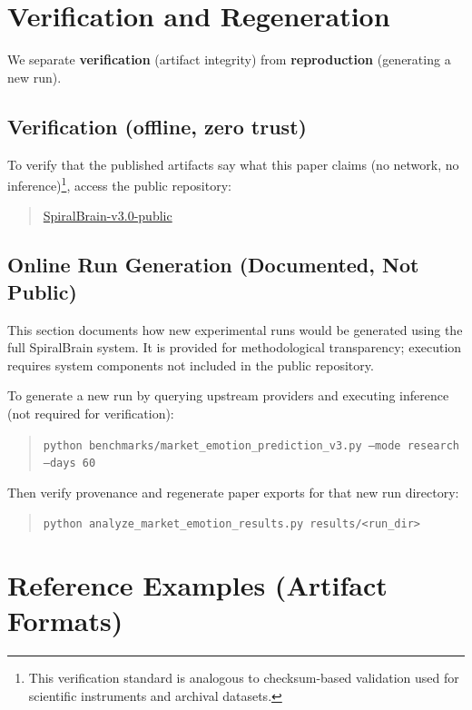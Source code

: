 \documentclass[12pt,a4paper]{report}
\begin{document}
\section{Verification and Regeneration}

We separate \textbf{verification} (artifact integrity) from \textbf{reproduction} (generating a new run).

\subsection{Verification (offline, zero trust)}

To verify that the published artifacts say what this paper claims (no network, no inference)\footnote{This verification standard is analogous to checksum-based validation used for scientific instruments and archival datasets.}, access the public repository:

\begin{quote}
\href{https://github.com/jhcragin/SpiralBrain-v3.0-public}{SpiralBrain-v3.0-public}
\end{quote}

\subsection{Online Run Generation (Documented, Not Public)}

This section documents how new experimental runs would be generated using the full SpiralBrain system. It is provided for methodological transparency; execution requires system components not included in the public repository.

To generate a new run by querying upstream providers and executing inference (not required for verification):

\begin{quote}
\texttt{python benchmarks/market\_emotion\_prediction\_v3.py --mode research --days 60}
\end{quote}

Then verify provenance and regenerate paper exports for that new run directory:

\begin{quote}
\texttt{python analyze\_market\_emotion\_results.py results/<run\_dir>}
\end{quote}

\pagebreak 

\appendix

\section{Reference Examples (Artifact Formats)}
\end{document}
